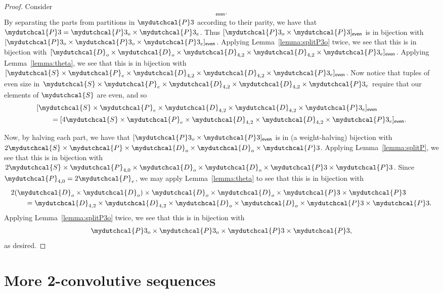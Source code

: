 \documentclass[12pt,reqno]{amsart}
\numberwithin{equation}{section}
\theoremstyle{plain}
\theoremstyle{definition}
\theoremstyle{named}
\newcommand{\cP}{\mydutchcal{P}}
\newcommand{\cD}{\mydutchcal{D}}
\newcommand{\cS}{\mydutchcal{S}}
\newcommand{\even}{\mathsf{even}}
\begin{document}
\begin{proof}
	Consider
	\begin{align*}
		[\cP3_{o} \times \cP3]_\even.
	\end{align*}
	By separating the parts from partitions in $\cP3$ according to their parity, we have that $\cP3 = \cP3_o \times \cP3_e$.
	Thus $[\cP3_{o} \times \cP3]_\even$ is in bijection with $[\cP3_{o} \times \cP3_o \times \cP3_e]_\even$. Applying Lemma~\ref{lemma:splitP3o} twice, we see that this is in bijection with $[\cD_{o} \times \cD_{o} \times \cD_{4,2} \times \cD_{4,2} \times \cP3_e]_\even$. Applying Lemma~\ref{lemma:theta}, we see that this is in bijection with $[\cS \times \cP_e \times \cD_{4,2} \times \cD_{4,2} \times \cP3_e]_\even$. Now notice that tuples of even size in $\cS \times \cP_e \times \cD_{4,2} \times \cD_{4,2} \times \cP3_e$ require that our elements of $\cS$ are even, and so
	\begin{align*}
		&[\cS \times \cP_e \times \cD_{4,2} \times \cD_{4,2} \times \cP3_e]_\even\\
		&\qquad = [4\cS \times \cP_e \times \cD_{4,2} \times \cD_{4,2} \times \cP3_e]_\even.
	\end{align*}
	
	Now, by halving each part, we have that $[\cP3_{o} \times \cP3]_\even$ is in (a weight-halving) bijection with $2\cS \times \cP \times \cD_o \times \cD_o \times \cP3$. Applying Lemma~\ref{lemma:splitP}, we see that this is in bijection with $2\cS \times \cP_{4,0} \times \cD_o \times \cD_o \times \cP3 \times \cP3$. Since $\cP_{4,0} = 2\cP_e$, we may apply Lemma~\ref{lemma:theta} to see that this is in bijection with
	\begin{align*}
		&2(\cD_o \times \cD_o) \times \cD_o \times \cD_o \times \cP3 \times \cP3\\
		&\qquad = \cD_{4,2} \times \cD_{4,2} \times \cD_o \times \cD_o \times \cP3 \times \cP3.
	\end{align*}
	Applying Lemma~\ref{lemma:splitP3o} twice, we see that this is in bijection with
	\begin{align*}
		\cP3_o \times \cP3_o \times \cP3 \times \cP3,
	\end{align*}
	as desired.
\end{proof}

\section{More 2-convolutive sequences}\label{sec:more}
\end{document}
